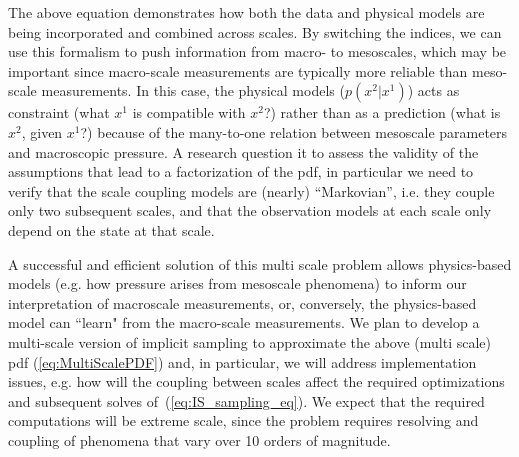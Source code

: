 \documentclass[11pt]{article}
\begin{document}
The above equation demonstrates how both the data and physical models are being incorporated and combined across scales.
By switching the indices, we can use this formalism to push information from macro- to mesoscales, which may be important since macro-scale measurements are typically more reliable than meso-scale measurements. In this case, the physical models ($p(x^2|x^1)$) acts as constraint (what $x^1$ is compatible with $x^2$?) rather than as a prediction (what is $x^2$, given $x^1$?) because of the many-to-one relation between mesoscale parameters and macroscopic pressure. A research question it to assess the validity of the assumptions that lead to a factorization of the pdf, in particular we need to verify that the scale coupling models are (nearly) ``Markovian'', i.e. they couple only two subsequent scales, and that the observation models at each scale only depend on the state at that scale. 

A successful and efficient solution of this multi scale problem allows physics-based models (e.g. how pressure arises from mesoscale phenomena) to inform our interpretation of macroscale measurements, or, conversely, the physics-based model can ``learn" from the macro-scale measurements. We plan to develop a multi-scale version of implicit sampling to approximate the above (multi scale) pdf (\ref{eq:MultiScalePDF}) and, in particular, we will address implementation issues, e.g. how will the coupling between scales affect the required optimizations and subsequent solves of~(\ref{eq:IS_sampling_eq}). We expect that the required computations will be extreme scale, since the problem requires resolving and coupling of phenomena that vary over 10 orders of magnitude.
\end{document}
